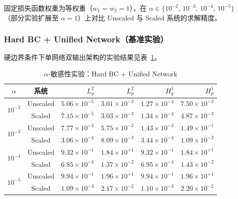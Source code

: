 固定损失函数权重为等权重（$w_1 = w_2 = 1$），在
$\alpha \in \{10^{-2},\,10^{-3},\,10^{-4},\,10^{-5}\}$
（部分实验扩展至 $\alpha = 1$）上对比 Unscaled 与 Scaled 系统的求解精度。

\subsubsection{Hard BC + Unified Network（基准实验）}

硬边界条件下单网络双输出架构的实验结果见表~\ref{tab:alpha-hard-unified}。

\begin{table}[H]
  \centering
  \caption{$\alpha$-敏感性实验：Hard BC + Unified Network}
  \label{tab:alpha-hard-unified}
  \small
  \begin{tabular}{cc rrrr}
    \toprule
    $\alpha$ & 系统 & $L^2_y$ & $L^2_p$ & $H^1_y$ & $H^1_p$ \\
    \midrule
    \multirow{2}{*}{$10^{-2}$}
      & Unscaled & $5.06\times10^{-5}$ & $3.01\times10^{-3}$
                 & $1.27\times10^{-4}$ & $7.50\times10^{-3}$ \\
      & Scaled   & $7.15\times10^{-5}$ & $3.03\times10^{-3}$
                 & $1.34\times10^{-4}$ & $4.87\times10^{-3}$ \\
    \midrule
    \multirow{2}{*}{$10^{-3}$}
      & Unscaled & $7.77\times10^{-4}$ & $5.75\times10^{-2}$
                 & $1.43\times10^{-3}$ & $1.49\times10^{-1}$ \\
      & Scaled   & $3.06\times10^{-4}$ & $8.09\times10^{-3}$
                 & $3.44\times10^{-4}$ & $1.09\times10^{-2}$ \\
    \midrule
    \multirow{2}{*}{$10^{-4}$}
      & Unscaled & $9.32\times10^{-1}$ & $1.84\times10^{+1}$
                 & $9.32\times10^{-1}$ & $1.84\times10^{+1}$ \\
      & Scaled   & $6.85\times10^{-4}$ & $1.37\times10^{-2}$
                 & $6.95\times10^{-4}$ & $1.43\times10^{-2}$ \\
    \midrule
    \multirow{2}{*}{$10^{-5}$}
      & Unscaled & $9.94\times10^{-1}$ & $1.96\times10^{+1}$
                 & $9.94\times10^{-1}$ & $1.96\times10^{+1}$ \\
      & Scaled   & $1.09\times10^{-3}$ & $2.17\times10^{-2}$
                 & $1.10\times10^{-3}$ & $2.20\times10^{-2}$ \\
    \bottomrule
  \end{tabular}
\end{table}

